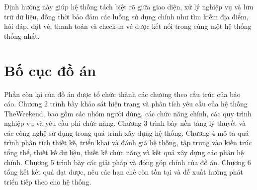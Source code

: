 \documentclass[../DoAn.tex]{subfiles}
\begin{document}
Định hướng này giúp hệ thống tách biệt rõ giữa giao diện, xử lý nghiệp vụ và lưu trữ dữ liệu, đồng thời bảo đảm các luồng sử dụng chính như tìm kiếm địa điểm, hỏi đáp, đặt vé, thanh toán và check-in vé được kết nối trong cùng một hệ thống thống nhất.

\section{Bố cục đồ án}

Phần còn lại của đồ án được tổ chức thành các chương theo cấu trúc của báo cáo. Chương 2 trình bày khảo sát hiện trạng và phân tích yêu cầu của hệ thống TheWeekend, bao gồm các nhóm người dùng, các chức năng chính, các quy trình nghiệp vụ và yêu cầu phi chức năng. Chương 3 trình bày nền tảng lý thuyết và các công nghệ sử dụng trong quá trình xây dựng hệ thống. Chương 4 mô tả quá trình phân tích thiết kế, triển khai và đánh giá hệ thống, tập trung vào kiến trúc tổng thể, thiết kế dữ liệu, thiết kế chức năng và kết quả xây dựng các phân hệ chính. Chương 5 trình bày các giải pháp và đóng góp chính của đồ án. Chương 6 tổng kết kết quả đạt được, nêu các hạn chế còn tồn tại và đề xuất hướng phát triển tiếp theo cho hệ thống.
\end{document}
